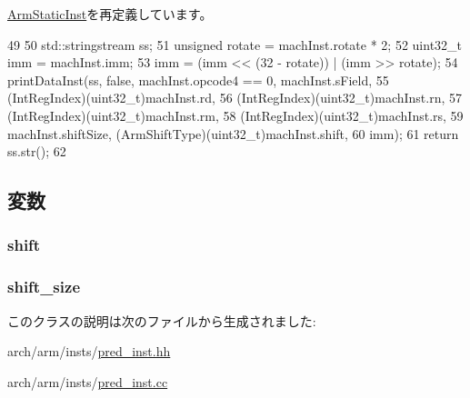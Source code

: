 \hyperlink{classArmISA_1_1ArmStaticInst_a95d323a22a5f07e14d6b4c9385a91896}{ArmStaticInst}を再定義しています。


\begin{DoxyCode}
49 {
50     std::stringstream ss;
51     unsigned rotate = machInst.rotate * 2;
52     uint32_t imm = machInst.imm;
53     imm = (imm << (32 - rotate)) | (imm >> rotate);
54     printDataInst(ss, false, machInst.opcode4 == 0, machInst.sField,
55             (IntRegIndex)(uint32_t)machInst.rd,
56             (IntRegIndex)(uint32_t)machInst.rn,
57             (IntRegIndex)(uint32_t)machInst.rm,
58             (IntRegIndex)(uint32_t)machInst.rs,
59             machInst.shiftSize, (ArmShiftType)(uint32_t)machInst.shift,
60             imm);
61     return ss.str();
62 }
\end{DoxyCode}


\subsection{変数}
\hypertarget{classArmISA_1_1PredIntOp_ae94a7e9e52306e4a9b768d55ffb25bc4}{
\subsubsection[{shift}]{ {\bf shift}}}
\label{classArmISA_1_1PredIntOp_ae94a7e9e52306e4a9b768d55ffb25bc4}
\hypertarget{classArmISA_1_1PredIntOp_a56a42ca0919e01ae2140b65e625c4be8}{
\subsubsection[{shift\_\-size}]{ {\bf shift\_\-size}}}
\label{classArmISA_1_1PredIntOp_a56a42ca0919e01ae2140b65e625c4be8}


このクラスの説明は次のファイルから生成されました:\begin{DoxyCompactItemize}
\item 
arch/arm/insts/\hyperlink{pred__inst_8hh}{pred\_\-inst.hh}\item 
arch/arm/insts/\hyperlink{pred__inst_8cc}{pred\_\-inst.cc}\end{DoxyCompactItemize}
